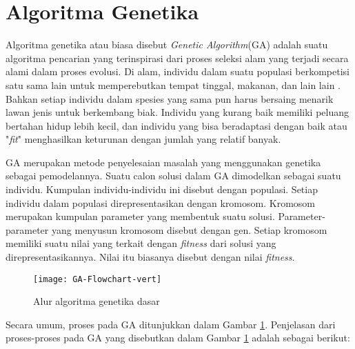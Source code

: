 \section{Algoritma Genetika}
\label{sec:GA}
Algoritma genetika atau biasa disebut \textit{Genetic Algorithm}(GA) adalah suatu algoritma pencarian yang terinspirasi dari proses seleksi alam yang terjadi secara alami dalam proses evolusi. Di alam, individu dalam suatu populasi berkompetisi satu sama lain untuk memperebutkan tempat tinggal, makanan, dan lain lain \cite{sivanandam2007introduction}. Bahkan setiap individu dalam spesies yang sama pun harus bersaing menarik lawan jenis untuk berkembang biak. Individu yang kurang baik memiliki peluang bertahan hidup lebih kecil, dan individu yang bisa beradaptasi dengan baik atau "\textit{fit}" menghasilkan keturunan dengan jumlah yang relatif banyak. 

GA merupakan metode penyelesaian masalah yang menggunakan genetika sebagai pemodelannya. Suatu calon solusi dalam GA dimodelkan sebagai suatu individu. Kumpulan individu-individu ini disebut dengan populasi. Setiap individu dalam populasi direpresentasikan dengan kromosom. Kromosom merupakan kumpulan parameter yang membentuk suatu solusi. Parameter-parameter yang menyusun kromosom disebut dengan gen. Setiap kromosom memiliki suatu nilai yang terkait dengan \textit{fitness} dari solusi yang direpresentasikannya. Nilai itu biasanya disebut dengan nilai \textit{fitness}.


\begin{figure}[H]
	\centering
	\texttt{[image: GA-Flowchart-vert]}
	\caption{Alur algoritma genetika dasar}
	\label{fig:GA-flowchart}
\end{figure}

Secara umum, proses pada GA ditunjukkan dalam Gambar \ref{fig:GA-flowchart}. Penjelasan dari proses-proses pada GA yang disebutkan dalam Gambar \ref{fig:GA-flowchart} adalah sebagai berikut:

